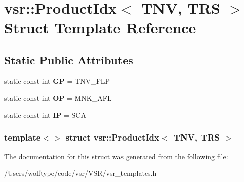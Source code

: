 \hypertarget{structvsr_1_1_product_idx_3_01_t_n_v_00_01_t_r_s_01_4}{\section{vsr\-:\-:Product\-Idx$<$ T\-N\-V, T\-R\-S $>$ Struct Template Reference}
\label{structvsr_1_1_product_idx_3_01_t_n_v_00_01_t_r_s_01_4}
}
\subsection*{Static Public Attributes}
\begin{DoxyCompactItemize}
\item 
\hypertarget{structvsr_1_1_product_idx_3_01_t_n_v_00_01_t_r_s_01_4_aa5bcd542b31249a4f6df8ea2d9b9d95a}{static const int {\bfseries G\-P} = T\-N\-V\-\_\-\-F\-L\-P}\label{structvsr_1_1_product_idx_3_01_t_n_v_00_01_t_r_s_01_4_aa5bcd542b31249a4f6df8ea2d9b9d95a}

\item 
\hypertarget{structvsr_1_1_product_idx_3_01_t_n_v_00_01_t_r_s_01_4_a7beb14fd4f831e03399203c5f6601e0f}{static const int {\bfseries O\-P} = M\-N\-K\-\_\-\-A\-F\-L}\label{structvsr_1_1_product_idx_3_01_t_n_v_00_01_t_r_s_01_4_a7beb14fd4f831e03399203c5f6601e0f}

\item 
\hypertarget{structvsr_1_1_product_idx_3_01_t_n_v_00_01_t_r_s_01_4_a9eb91f0e0e1422e76f40dc7c3a027a40}{static const int {\bfseries I\-P} = S\-C\-A}\label{structvsr_1_1_product_idx_3_01_t_n_v_00_01_t_r_s_01_4_a9eb91f0e0e1422e76f40dc7c3a027a40}

\end{DoxyCompactItemize}
\subsubsection*{template$<$$>$ struct vsr\-::\-Product\-Idx$<$ T\-N\-V, T\-R\-S $>$}



The documentation for this struct was generated from the following file\-:\begin{DoxyCompactItemize}
\item 
/\-Users/wolftype/code/vsr/\-V\-S\-R/vsr\-\_\-templates.\-h\end{DoxyCompactItemize}
